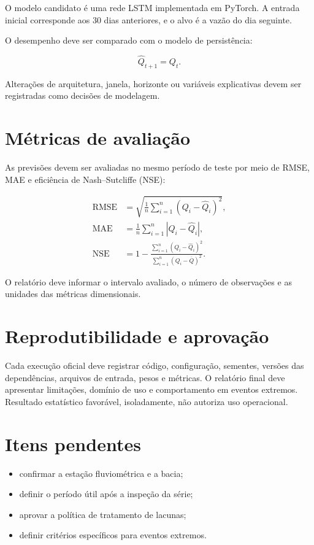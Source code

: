 \documentclass[12pt,a4paper]{article}
\begin{document}
O modelo candidato é uma rede LSTM implementada em PyTorch. A entrada inicial
corresponde aos 30 dias anteriores, e o alvo é a vazão do dia seguinte.

O desempenho deve ser comparado com o modelo de persistência:

\begin{equation}
    \widehat{Q}_{t+1} = Q_t.
\end{equation}

Alterações de arquitetura, janela, horizonte ou variáveis explicativas devem
ser registradas como decisões de modelagem.

\section{Métricas de avaliação}

As previsões devem ser avaliadas no mesmo período de teste por meio de RMSE,
MAE e eficiência de Nash--Sutcliffe (NSE):

\begin{align}
    \mathrm{RMSE} &= \sqrt{\frac{1}{n}\sum_{i=1}^{n}
    \left(Q_i-\widehat{Q}_i\right)^2}, \\
    \mathrm{MAE} &= \frac{1}{n}\sum_{i=1}^{n}
    \left|Q_i-\widehat{Q}_i\right|, \\
    \mathrm{NSE} &= 1 -
    \frac{\sum_{i=1}^{n}\left(Q_i-\widehat{Q}_i\right)^2}
    {\sum_{i=1}^{n}\left(Q_i-\overline{Q}\right)^2}.
\end{align}

O relatório deve informar o intervalo avaliado, o número de observações e as
unidades das métricas dimensionais.

\section{Reprodutibilidade e aprovação}

Cada execução oficial deve registrar código, configuração, sementes, versões
das dependências, arquivos de entrada, pesos e métricas. O relatório final deve
apresentar limitações, domínio de uso e comportamento em eventos extremos.
Resultado estatístico favorável, isoladamente, não autoriza uso operacional.

\section{Itens pendentes}

\begin{itemize}
    \item confirmar a estação fluviométrica e a bacia;
    \item definir o período útil após a inspeção da série;
    \item aprovar a política de tratamento de lacunas;
    \item definir critérios específicos para eventos extremos.
\end{itemize}
\end{document}
